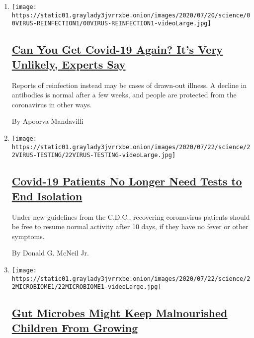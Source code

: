 \begin{enumerate}
\def\labelenumi{\arabic{enumi}.}
\item
  \texttt{[image: https://static01.graylady3jvrrxbe.onion/images/2020/07/20/science/00VIRUS-REINFECTION1/00VIRUS-REINFECTION1-videoLarge.jpg]}

  \hypertarget{can-you-get-covid-19-again-its-very-unlikely-experts-say}{%
  \subsection{\texorpdfstring{\href{/2020/07/22/health/covid-antibodies-herd-immunity.html}{Can
  You Get Covid-19 Again? It's Very Unlikely, Experts
  Say}}{Can You Get Covid-19 Again? It's Very Unlikely, Experts Say}}\label{can-you-get-covid-19-again-its-very-unlikely-experts-say}}

  Reports of reinfection instead may be cases of drawn-out illness. A
  decline in antibodies is normal after a few weeks, and people are
  protected from the coronavirus in other ways.

  By Apoorva Mandavilli
\item
  \texttt{[image: https://static01.graylady3jvrrxbe.onion/images/2020/07/22/science/22VIRUS-TESTING/22VIRUS-TESTING-videoLarge.jpg]}

  \hypertarget{covid-19-patients-no-longer-need-tests-to-end-isolation}{%
  \subsection{\texorpdfstring{\href{/2020/07/22/health/coronavirus-isolation-testing.html}{Covid-19
  Patients No Longer Need Tests to End
  Isolation}}{Covid-19 Patients No Longer Need Tests to End Isolation}}\label{covid-19-patients-no-longer-need-tests-to-end-isolation}}

  Under new guidelines from the C.D.C., recovering coronavirus patients
  should be free to resume normal activity after 10 days, if they have
  no fever or other symptoms.

  By Donald G. McNeil Jr.
\item
  \texttt{[image: https://static01.graylady3jvrrxbe.onion/images/2020/07/22/science/22MICROBIOME1/22MICROBIOME1-videoLarge.jpg]}

  \hypertarget{gut-microbes-might-keep-malnourished-children-from-growing}{%
  \subsection{\texorpdfstring{\href{/2020/07/22/health/microbiome-malnourishment-children.html}{Gut
  Microbes Might Keep Malnourished Children From
  Growing}}{Gut Microbes Might Keep Malnourished Children From Growing}}\label{gut-microbes-might-keep-malnourished-children-from-growing}}


\end{enumerate}
